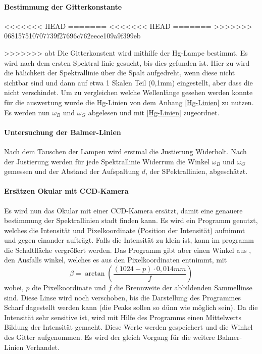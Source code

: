 \paragraph{Bestimmung der Gitterkonstante}
<<<<<<< HEAD
=======
<<<<<<< HEAD
=======
>>>>>>> 068157510707739f27696c762eece109a9f399eb

>>>>>>> abt
Die Gitterkonstent wird mithilfe der Hg-Lampe bestimmt.
Es wird nach dem ersten Spektral linie gesucht, bis dies gefunden ist. 
Hier zu wird die hälichkeit der Spektrallinie über die Spalt aufgedreht, wenn diese nicht sichtbar sind und dann auf etwa 1 Skalen Teil (0,1mm) eingestellt, aber dass die nicht verschindet.
Um zu vergleichen welche Wellenlänge gesehen werden konnte für die auswertung wurde die Hg-Linien von dem Anhang \cref{Hg-Linien} zu nutzen.
Es werden nun $\omega_B$ und $\omega_G$ abgelesen und mit \cref{Hg-Linien} zugeordnet.

\paragraph{Untersuchung der Balmer-Linien}
Nach dem Tauschen der Lampen wird erstmal die Justierung Widerholt. 
Nach der Justierung werden für jede Spektrallinie Widerrum die Winkel $\omega_B$ und $\omega_G$ gemessen und der Abstand der Aufspaltung $d$, der SPektrallinien, abgeschätzt.

\paragraph{Ersätzen Okular mit CCD-Kamera}
Es wird nun das Okular mit einer CCD-Kamera ersätzt, damit eine genauere bestimmung der Spektrallinien stadt finden kann. 
Es wird ein Programm genutzt, welches die Intensität und Pixelkoordinate (Position der Intensität) aufnimmt und gegen einander aufträgt. 
Falls die Intensität zu klein ist, kann im programm die Schaltfläche vergrößert werden.
Das Programm gibt aber einen Winkel aus , den Ausfalls winkel, welches es aus den Pixelkoordinaten entnimmt, mit 
\begin{equation}
    \beta = \arctan(\frac{(1024-p)\cdot0,014mm}{f})
\end{equation}
wobei, $p$ die Pixelkoordinate und $f$ die Brennweite der abbildenden Sammellinse sind.
Diese Linse wird noch verschoben, bis die Darstellung des Programmes Scharf dagestellt werden kann (die Peaks sollen so dünn wie möglich sein).
Da die Intensität sehr sensitive ist, wird mit Hilfe des Programms einen Mittelwerts Bildung der Intensität gemacht. 
Diese Werte werden gespeichert und die Winkel des Gitter aufgenommen. 
Es wird der gleich Vorgang für die weitere Balmer-Linien Verhandet.


